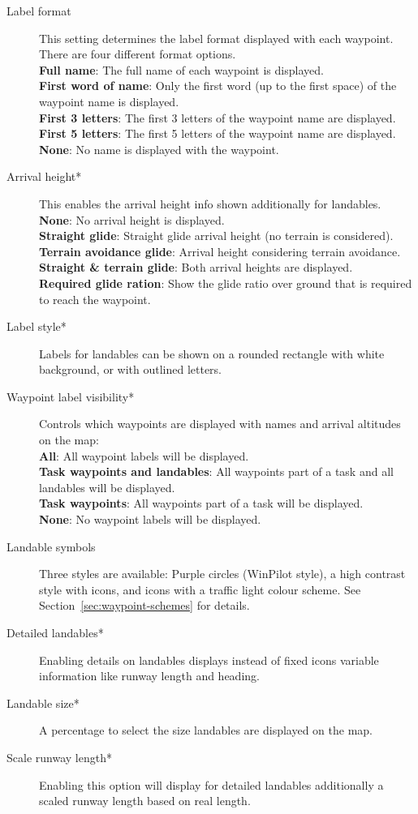 \begin{description}
\item[Label format]  This setting \label{conf:labels} determines the label format 
  displayed with each waypoint. There are four different format options. \\
  {\bf Full name}: The full name of each waypoint is displayed. \\
  {\bf First word of name}: Only the first word (up to the first space) of the 
  waypoint name is displayed.
 \\
  {\bf First 3 letters}: The first 3 letters of the waypoint name are displayed. \\
  {\bf First 5 letters}: The first 5 letters of the waypoint name are displayed. \\
  {\bf None}: No name is displayed with the waypoint.
\item[Arrival height*]  This enables the arrival height info shown additionally 
  for landables. \\
  {\bf None}: No arrival height is displayed. \\
  {\bf Straight glide}: Straight glide arrival height (no terrain is considered). \\
  {\bf Terrain avoidance glide}: Arrival height considering terrain avoidance. \\
  {\bf Straight \& terrain glide}: Both arrival heights are
  displayed. \\
  {\bf Required glide ration}: Show the glide ratio over ground that is
  required to reach the waypoint.
\item[Label style*]  Labels for landables can be shown on a rounded rectangle with 
  white background, or with outlined letters.
\item[Waypoint label visibility*]  \label{conf:labelvisibility} Controls which waypoints 
  are displayed with names and arrival altitudes on the map: \\
  {\bf All}: All waypoint labels will be displayed. \\
  {\bf Task waypoints and landables}: All waypoints part of a task and all landables 
  will be displayed. \\
  {\bf Task waypoints}: All waypoints part of a task will be displayed. \\
  {\bf None}:  No waypoint labels will be displayed.
\item[Landable symbols]  \label{conf:waypointicons} Three styles are available:
  Purple circles (WinPilot style), a high contrast style with icons,
  and icons with a traffic light colour scheme. See Section~\ref{sec:waypoint-schemes} for details.
\item[Detailed landables*]  Enabling details on landables displays instead of fixed icons 
  variable information like runway length and heading.
\item[Landable size*]  A percentage to select the size landables are displayed on the map.
\item[Scale runway length*]  Enabling this option will display for detailed landables 
  additionally a scaled runway length based on real length.
\end{description}



